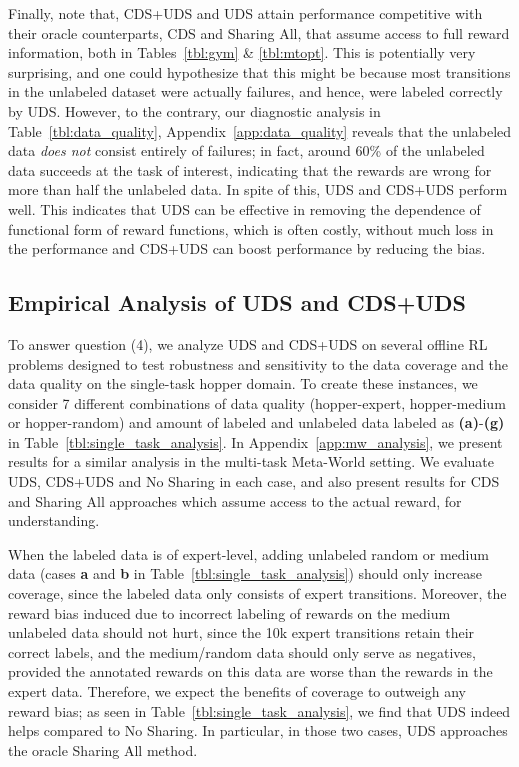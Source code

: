 Finally, note that, CDS+UDS and UDS attain performance competitive with their oracle counterparts, CDS and Sharing All, that assume access to full reward information, both in Tables~\ref{tbl:gym} \& \ref{tbl:mtopt}. This is potentially very surprising, and one could hypothesize that this might be because most transitions in the unlabeled dataset were actually failures, and hence, were labeled correctly by UDS. However, to the contrary, our diagnostic analysis in Table~\ref{tbl:data_quality}, Appendix~\ref{app:data_quality} reveals that the unlabeled data \emph{does not} consist entirely of failures; in fact, around 60\% of the unlabeled data succeeds at the task of interest, indicating that the rewards are wrong for more than half the unlabeled data. In spite of this, UDS and CDS+UDS perform well. This indicates that UDS can be effective in removing the dependence of functional form of reward functions, which is often costly, without much loss in the performance and CDS+UDS can boost performance by reducing the bias.


\subsection{Empirical Analysis of UDS and CDS+UDS}
\label{sec:empirical_analysis}

To answer question (4), we analyze UDS and CDS+UDS on several offline RL problems designed to test robustness and sensitivity to the data coverage and the data quality on the single-task hopper domain. To create these instances, we consider 7 different combinations of data quality ({hopper-expert}, {hopper-medium} or {hopper-random}) and amount of labeled and unlabeled data labeled as \textbf{(a)}-\textbf{(g)} in Table~\ref{tbl:single_task_analysis}. In Appendix~\ref{app:mw_analysis}, we present results for a similar analysis in the multi-task Meta-World setting. We evaluate UDS, CDS+UDS and No Sharing in each case, and also present results for CDS and Sharing All approaches which assume access to the actual reward, for understanding. 


When the labeled data is of expert-level, adding unlabeled random or medium data (cases \textbf{a} and \textbf{b} in Table~\ref{tbl:single_task_analysis}) should only increase coverage, since the labeled data only consists of expert transitions. Moreover, the reward bias induced due to incorrect labeling of rewards on the medium unlabeled data should not hurt, since the 10k expert transitions retain their correct labels, and the medium/random data should only serve as negatives, provided the annotated rewards on this data are worse than the rewards in the expert data. Therefore, we expect the benefits of coverage to outweigh any reward bias; as seen in Table~\ref{tbl:single_task_analysis}, we find that UDS indeed helps compared to No Sharing. In particular, in those two cases, UDS approaches the oracle Sharing All method. 

